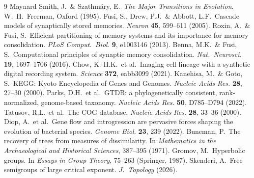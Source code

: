 \documentclass[11pt]{article}
\begin{document}
\begin{thebibliography}{9}
 Maynard Smith, J.\ \& Szathmáry, E.\ \emph{The Major Transitions in Evolution}. W.\ H.\ Freeman, Oxford (1995).
 Fusi, S., Drew, P.J.\ \& Abbott, L.F.\ Cascade models of synaptically stored memories. \emph{Neuron} \textbf{45}, 599--611 (2005).
 Roxin, A.\ \& Fusi, S.\ Efficient partitioning of memory systems and its importance for memory consolidation. \emph{PLoS Comput.\ Biol.} \textbf{9}, e1003146 (2013).
 Benna, M.K.\ \& Fusi, S.\ Computational principles of synaptic memory consolidation. \emph{Nat.\ Neurosci.} \textbf{19}, 1697--1706 (2016).
 Chow, K.-H.K.\ et al.\ Imaging cell lineage with a synthetic digital recording system. \emph{Science} \textbf{372}, eabb3099 (2021).
 Kanehisa, M.\ \& Goto, S.\ KEGG: Kyoto Encyclopedia of Genes and Genomes. \emph{Nucleic Acids Res.} \textbf{28}, 27--30 (2000).
 Parks, D.H.\ et al.\ GTDB: a phylogenetically consistent, rank-normalized, genome-based taxonomy. \emph{Nucleic Acids Res.} \textbf{50}, D785--D794 (2022).
 Tatusov, R.L.\ et al.\ The COG database. \emph{Nucleic Acids Res.} \textbf{28}, 33--36 (2000).
 Diop, A.\ et al.\ Gene flow and introgression are pervasive forces shaping the evolution of bacterial species. \emph{Genome Biol.} \textbf{23}, 239 (2022).
 Buneman, P.\ The recovery of trees from measures of dissimilarity. In \emph{Mathematics in the Archaeological and Historical Sciences}, 387--395 (1971).
 Gromov, M.\ Hyperbolic groups. In \emph{Essays in Group Theory}, 75--263 (Springer, 1987).
 Skenderi, A.\ Free semigroups of large critical exponent. \emph{J.\ Topology} (2026).
\end{thebibliography}
\end{document}
